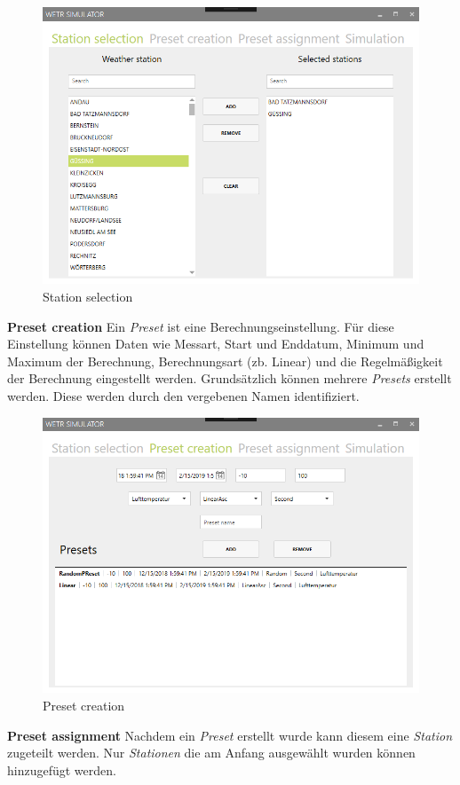 \begin{figure}[H]
\centering
\includegraphics[width=.6\textwidth]{pictures/Simulator/Simulator_1_StationSelection.png}
\caption{Station selection}
\label{fig:Wetr.Simulator.Wpf.StationSelection}
\end{figure}
\raggedright

\textbf{Preset creation}\newline
Ein \textit{Preset} ist eine Berechnungseinstellung. Für diese Einstellung können Daten wie Messart, Start und Enddatum, Minimum und Maximum der Berechnung, Berechnungsart (zb. Linear) und die Regelmäßigkeit der Berechnung eingestellt werden. 
Grundsätzlich können mehrere \textit{Presets} erstellt werden. Diese werden durch den vergebenen Namen identifiziert.

\begin{figure}[H]
\centering
\includegraphics[width=.6\textwidth]{pictures/Simulator/Simulator_2_PresetCreation.png}
\caption{Preset creation}
\label{fig:Wetr.Simulator.Wpf.PresetCreation}
\end{figure}
\raggedright

\textbf{Preset assignment}\newline
Nachdem ein \textit{Preset} erstellt wurde kann diesem eine \textit{Station} zugeteilt werden. Nur \textit{Stationen} die am Anfang ausgewählt wurden können hinzugefügt werden.

